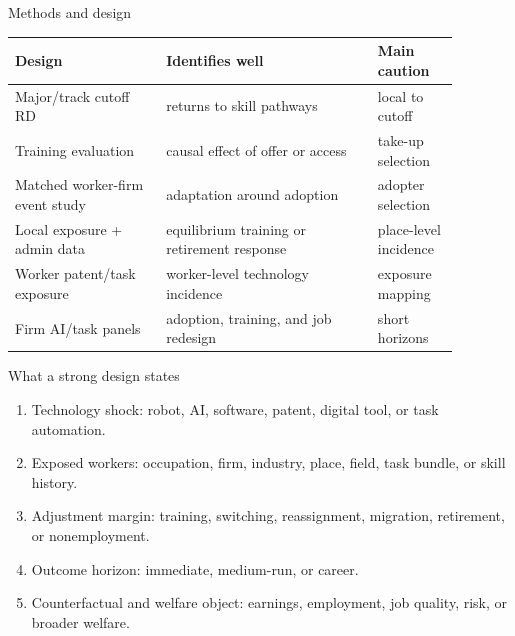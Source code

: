 \documentclass[aspectratio=169,11pt]{beamer}
\begin{document}
\begin{frame}{Methods and design}
\small
\begin{tabular}{p{0.30\linewidth} p{0.42\linewidth} p{0.16\linewidth}}
\toprule
Design & Identifies well & Main caution \\
\midrule
Major/track cutoff RD & returns to skill pathways & local to cutoff \\
Training evaluation & causal effect of offer or access & take-up selection \\
Matched worker-firm event study & adaptation around adoption & adopter selection \\
Local exposure + admin data & equilibrium training or retirement response & place-level incidence \\
Worker patent/task exposure & worker-level technology incidence & exposure mapping \\
Firm AI/task panels & adoption, training, and job redesign & short horizons \\
\bottomrule
\end{tabular}
\end{frame}

\begin{frame}{What a strong design states}
\begin{enumerate}
    \item Technology shock: robot, AI, software, patent, digital tool, or task automation.
    \item Exposed workers: occupation, firm, industry, place, field, task bundle, or skill history.
    \item Adjustment margin: training, switching, reassignment, migration, retirement, or nonemployment.
    \item Outcome horizon: immediate, medium-run, or career.
    \item Counterfactual and welfare object: earnings, employment, job quality, risk, or broader welfare.
\end{enumerate}
\end{frame}
\end{document}
